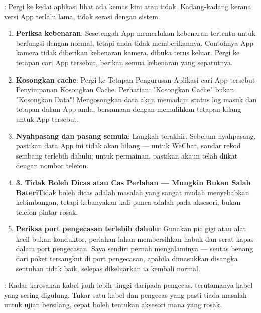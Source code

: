 
: Pergi ke kedai aplikasi lihat ada kemas kini atau tidak. Kadang-kadang kerana versi App terlalu lama, tidak serasi dengan sistem.

\begin{enumerate}
  \item \textbf{Periksa kebenaran}: Sesetengah App memerlukan kebenaran tertentu untuk berfungsi dengan normal, tetapi anda tidak memberikannya. Contohnya App kamera tidak diberikan kebenaran kamera, dibuka terus keluar. Pergi ke tetapan cari App tersebut, berikan semua kebenaran yang sepatutnya.
  \item \textbf{Kosongkan cache}: Pergi ke Tetapan Pengurusan Aplikasi cari App tersebut Penyimpanan Kosongkan Cache. Perhatian: "Kosongkan Cache" bukan "Kosongkan Data"! Mengosongkan data akan memadam status log masuk dan tetapan dalam App anda, bersamaan dengan memulihkan tetapan kilang untuk App tersebut.
  \item \textbf{Nyahpasang dan pasang semula}: Langkah terakhir. Sebelum nyahpasang, pastikan data App ini tidak akan hilang — untuk WeChat, sandar rekod sembang terlebih dahulu; untuk permainan, pastikan akaun telah diikat dengan nombor telefon.
  \item \textbf{3. Tidak Boleh Dicas atau Cas Perlahan — Mungkin Bukan Salah Bateri}Tidak boleh dicas adalah masalah yang sangat mudah menyebabkan kebimbangan, tetapi kebanyakan kali punca adalah pada aksesori, bukan telefon pintar rosak.
  \item \textbf{Periksa port pengecasan terlebih dahulu}: Gunakan pic gigi atau alat kecil bukan konduktor, perlahan-lahan membersihkan habuk dan serat kapas dalam port pengecasan. Saya sendiri pernah mengalaminya — seutas benang dari poket tersangkut di port pengecasan, apabila dimasukkan disangka sentuhan tidak baik, selepas dikeluarkan ia kembali normal.
\end{enumerate}


: Kadar kerosakan kabel jauh lebih tinggi daripada pengecas, terutamanya kabel yang sering digulung. Tukar satu kabel dan pengecas yang pasti tiada masalah untuk ujian bersilang, cepat boleh tentukan aksesori mana yang rosak.

